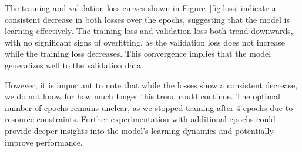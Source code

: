             The training and validation loss curves shown in Figure~\ref{fig:loss} indicate a consistent decrease in both losses over the epochs, suggesting that the model is learning effectively. The training loss and validation loss both trend downwards, with no significant signs of overfitting, as the validation loss does not increase while the training loss decreases. This convergence implies that the model generalizes well to the validation data.
            
            However, it is important to note that while the losses show a consistent decrease, we do not know for how much longer this trend could continue. The optimal number of epochs remains unclear, as we stopped training after 4 epochs due to resource constraints. Further experimentation with additional epochs could provide deeper insights into the model's learning dynamics and potentially improve performance. 
            
            \vspace{-0.1cm}
            

